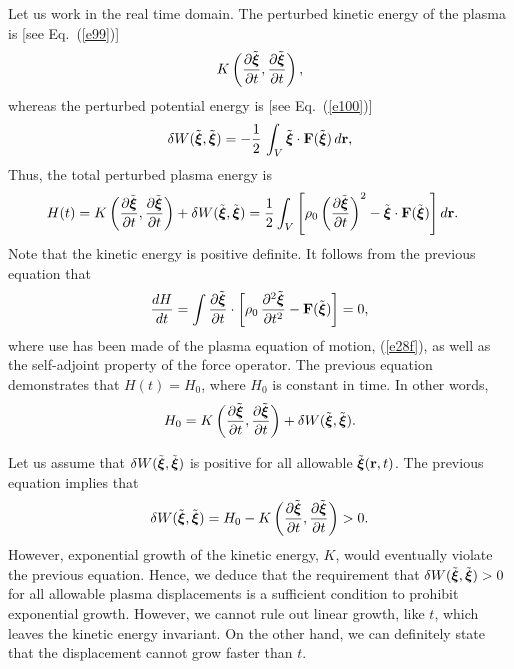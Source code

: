 \documentclass[12pt,prb,aps,notitlepage]{revtex4-1}
\newcommand{\bxi}{\mbox{\boldmath$\xi$}}
\begin{document}
Let
us work in the real time domain. The perturbed kinetic energy of the plasma is [see Eq.~(\ref{e99})] 
\begin{equation}
K\left(\frac{\partial\tilde{\bxi}}{\partial t},\frac{\partial\tilde{\bxi}}{\partial t}\right),
\end{equation}
whereas the perturbed potential energy is  [see Eq.~(\ref{e100})]
\begin{equation} \label{e131ff}
\delta W(\tilde{\bxi},\tilde{\bxi}) = - \frac{1}{2}\,\int_V \tilde{\bxi}\cdot {\bf F}(\tilde{\bxi})\,d{\bf r},
\end{equation}
Thus, the total perturbed plasma energy
is 
\begin{align}
H(t)& = K\left(\frac{\partial\tilde{\bxi}}{\partial t},\frac{\partial\tilde{\bxi}}{\partial t}\right) + \delta W(\tilde{\bxi},\tilde{\bxi})= \frac{1}{2}\int_V\left[\rho_0\left(\frac{\partial\tilde{\bxi}}{\partial t}\right)^2 - \tilde{\bxi}\cdot{\bf F}(\tilde{\bxi})\right]d{\bf r}.
\end{align}
Note that the kinetic energy is positive definite. 
It follows from the previous equation that 
\begin{equation}
\frac{dH}{dt} = \int \frac{\partial\tilde{\bxi}}{\partial t}\cdot\left[\rho_0\,\frac{\partial^2\tilde{\bxi}}{\partial t^2}-{\bf F}(\tilde{\bxi})\right]=0,
\end{equation}
where use has been made of the plasma equation of motion, (\ref{e28f}), as well as the self-adjoint property of the force operator. The
previous equation demonstrates that $H(t)= H_0$, where $H_0$ is constant in time. In other words,
\begin{equation}\label{e125f}
H_0 = K\left(\frac{\partial\tilde{\bxi}}{\partial t},\frac{\partial\tilde{\bxi}}{\partial t}\right) + \delta W(\tilde{\bxi},\tilde{\bxi}).
\end{equation}

Let us assume that $\delta W(\tilde{\bxi},\tilde{\bxi})$ is positive for all allowable $\tilde{\bxi}({\bf r},t)$. The previous equation implies that
\begin{equation}
\delta W(\tilde{\bxi},\tilde{\bxi}) = H_0 - K\left(\frac{\partial\tilde{\bxi}}{\partial t},\frac{\partial\tilde{\bxi}}{\partial t}\right) > 0.
\end{equation}
However, exponential growth of the kinetic energy, $K$,  would eventually violate the previous equation.
Hence, we deduce that the requirement that $\delta W(\tilde{\bxi},\tilde{\bxi})>0$ for all allowable  plasma displacements is a sufficient condition to prohibit exponential growth. 
However, we cannot rule out linear growth, like $t$, which leaves the kinetic energy invariant. On the other hand, we can  definitely state that the displacement cannot
grow faster than $t$. 
\end{document}
